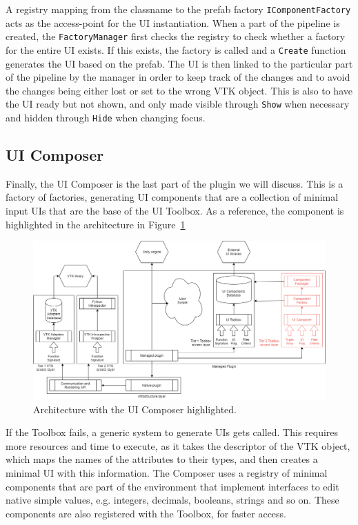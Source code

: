 A registry mapping from the classname to the prefab factory \verb|IComponentFactory| acts as the access-point for the UI instantiation. When a part of the pipeline is created, the \verb|FactoryManager| first checks the registry to check whether a factory for the entire UI exists. If this exists, the factory is called and a \verb|Create| function generates the UI based on the prefab. The UI is then linked to the particular part of the pipeline by the manager in order to keep track of the changes and to avoid the changes being either lost or set to the wrong VTK object. This is also to have the UI ready but not shown, and only made visible through \verb|Show| when necessary and hidden through \verb|Hide| when changing focus.

\subsection{UI Composer}
\label{sec:design-uicomposer}

Finally, the UI Composer is the last part of the plugin we will discuss. This is a factory of factories, generating UI components that are a collection of minimal input UIs that are the base of the UI Toolbox. As a reference, the component is highlighted in the architecture in Figure~\ref{fig:arch-comp}

\begin{figure}
    \centering
    \includegraphics[width=\textwidth]{pictures/Architecture-v0.3-comp.png}
    \caption{Architecture with the UI Composer highlighted.}
    \label{fig:arch-comp}
\end{figure}

If the Toolbox fails, a generic system to generate UIs gets called. This requires more resources and time to execute, as it takes the descriptor of the VTK object, which maps the names of the attributes to their types, and then creates a minimal UI with this information. The Composer uses a registry of minimal components that are part of the environment that implement interfaces to edit native simple values, e.g. integers, decimals, booleans, strings and so on. These components are also registered with the Toolbox, for faster access.

